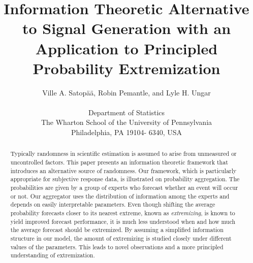 \documentclass[11pt,twoside]{article}
\begin{document}
\title{Information Theoretic Alternative to Signal Generation with an Application to Principled Probability Extremization}
\author{
Ville A. Satop\"a\"a, Robin Pemantle, and Lyle H. Ungar\\
\\
 \small Department of Statistics\\
 \small The Wharton School of the University of Pennsylvania\\
 \small Philadelphia, PA 19104- 6340, USA\\ [-0.25in]} \date{}
\maketitle

\pagestyle{myheadings}
\thispagestyle{empty}

\begin{abstract}
Typically randomness in scientific estimation is assumed to arise from unmeasured or uncontrolled factors. This paper presents an information theoretic framework that introduces an alternative source of randomness. Our framework, which is particularly appropriate for subjective response data, is illustrated on probability aggregation. The probabilities are given by a group of experts who forecast whether an event will occur or not. Our aggregator uses the distribution of information among the experts and depends on easily interpretable parameters. Even though shifting the average probability forecasts closer to its nearest extreme, known as \textit{extremizing}, is known to yield improved forecast performance, it is much less understood when and how much the average forecast should be extremized. By assuming a simplified information structure in our model, the amount of extremizing is studied closely under different values of  the parameters. This leads to novel observations and a more principled understanding of extremization.
\end{abstract}

\end{document}
